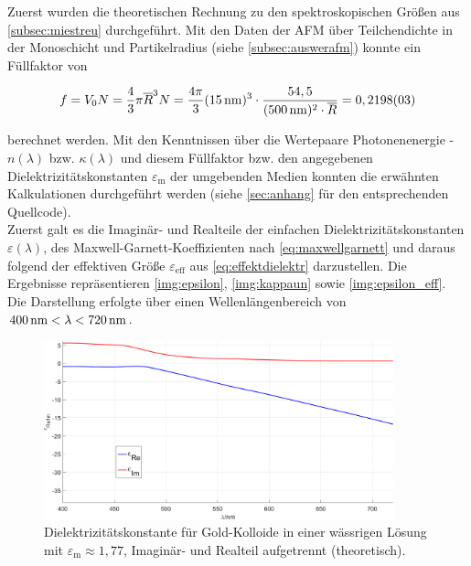 \documentclass[numbers=noenddot,a4paper,notitlepage,twoside,BCOR15mm]{scrartcl}
\newcommand{\ix}[1]{_\text{#1}}
\begin{document}
			Zuerst wurden die theoretischen Rechnung zu den spektroskopischen Größen aus \autoref{subsec:miestreu} durchgeführt. Mit den Daten der AFM über Teilchendichte in der Monoschicht und Partikelradius (siehe \autoref{subsec:auswerafm}) konnte ein Füllfaktor von

				\begin{align}
					f=V\ix{0}N=\frac{4}{3}\pi \overline{R}^3 N= \frac{4\pi}{3}(\unit[15]{nm})^3\cdot\frac{54,5}{(\unit[500]{nm})^2\cdot\overline{R}}=0,2198(03)
				\end{align}

			berechnet werden. Mit den Kenntnissen über die Wertepaare Photonenenergie - $n(\lambda)$ bzw. $\kappa(\lambda)$ und diesem Füllfaktor bzw. den angegebenen Dielektrizitätskonstanten $\varepsilon\ix{m}$ der umgebenden Medien konnten die erwähnten Kalkulationen durchgeführt werden (siehe \autoref{sec:anhang} für den entsprechenden Quellcode).\\
			Zuerst galt es die Imaginär- und Realteile der einfachen Dielektrizitätskonstanten $\varepsilon(\lambda)$, des Maxwell-Garnett-Koeffizienten nach \autoref{eq:maxwellgarnett} und daraus folgend der effektiven Größe $\varepsilon\ix{eff}$ aus \autoref{eq:effektdielektr} darzustellen. Die Ergebnisse repräsentieren \autoref{img:epsilon}, \autoref{img:kappaun} sowie \autoref{img:epsilon_eff}. Die Darstellung erfolgte über einen Wellenlängenbereich von $\unit[400]{nm}<\lambda<\unit[720]{nm}$.

				\begin{figure}[H]
					\includegraphics[width=0.9\textwidth]{epsilon_uber_lambda.png}
					\caption{Dielektrizitätskonstante für Gold-Kolloide in einer wässrigen Lösung mit $\varepsilon\ix{m}\approx1,77$, Imaginär- und Realteil aufgetrennt (theoretisch).}
					\label{img:epsilon}
				\end{figure}
\end{document}
